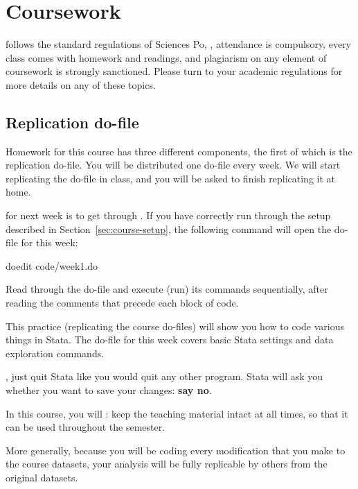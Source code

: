
\section{Coursework}

 follows the standard regulations of Sciences Po, \ie, attendance is compulsory, every class comes with homework and readings, and plagiarism on any element of coursework is strongly sanctioned. Please turn to your academic regulations for more details on any of these topics.%

\subsection{Replication do-file}

Homework for this course has three different components, the first of which is the replication do-file. You will be distributed one do-file every week. We will start replicating the do-file in class, and you will be asked to finish replicating it at home.%

 for next week is to get through . If you have correctly run through the setup described in Section~\ref{sec:course-setup}, the following command will open the do-file for this week:%

\begin{docspec}
  doedit code/week1.do
\end{docspec}

Read through the do-file and execute (run) its commands sequentially, after reading the comments that precede each block of code.%

This practice (replicating the course do-files) will show you how to code various things in Stata. The do-file for this week covers basic Stata settings and data exploration commands.%

, just quit Stata like you would quit any other program. Stata will ask you whether you want to save your changes: \textbf{say no}.%

In this course, you will : keep the teaching material intact at all times, so that it can be used throughout the semester.%

More generally, because you will be coding every modification that you make to the course datasets, your analysis will be fully replicable by others from the original datasets.%

